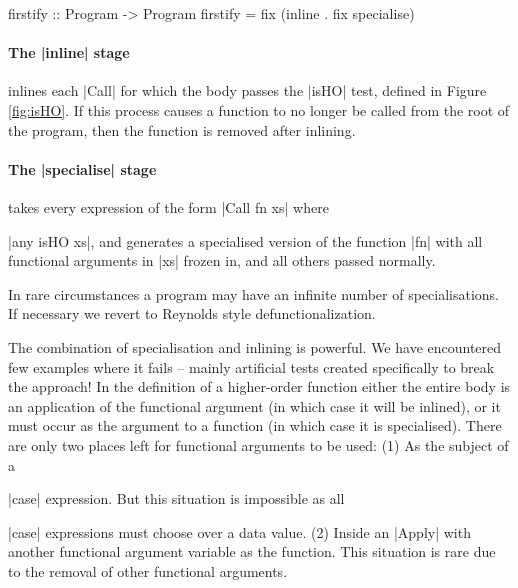 \ignore\begin{code}
firstify :: Program -> Program
firstify = fix (inline . fix specialise)
\end{code}

\paragraph{The |inline| stage} inlines each |Call| for which the body passes the |isHO| test, defined in Figure \ref{fig:isHO}. If this process causes a function to no longer be called from the root of the program, then the function is removed after inlining.

\paragraph{The |specialise| stage} takes every expression of the form |Call fn xs| where \ignore|any isHO xs|, and generates a specialised version of the function |fn| with all functional arguments in |xs| frozen in, and all others passed normally.

In rare circumstances a program may have an infinite number of specialisations. If necessary we revert to Reynolds style defunctionalization.

The combination of specialisation and inlining is powerful. We have encountered few examples where it fails -- mainly artificial tests created specifically to break the approach! In the definition of a higher-order function either the entire body is an application of the functional argument (in which case it will be inlined), or it must occur as the argument to a function (in which case it is specialised). There are only two places left for functional arguments to be used: (1) As the subject of a \ignore|case| expression. But this situation is impossible as all \ignore|case| expressions must choose over a data value. (2) Inside an |Apply| with another functional argument variable as the function. This situation is rare due to the removal of other functional arguments.
